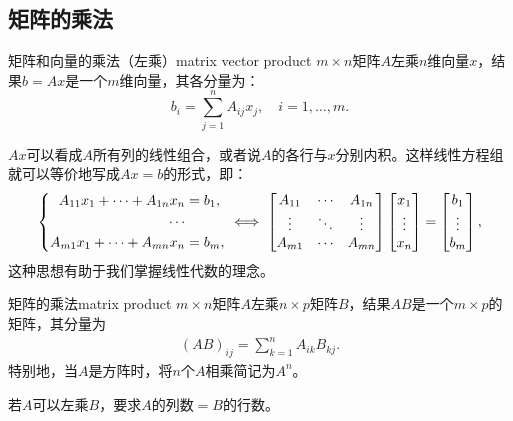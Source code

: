 \subsection{矩阵的乘法}

\begin{definition}
	{矩阵和向量的乘法（左乘）}{matrix vector product}
	$m\times n$矩阵$A$左乘$n$维向量$x$，结果$b=Ax$是一个$m$维向量，其各分量为：
	\begin{equation}
		b_i=\sum_{j=1}^nA_{ij}x_j,\quad i=1,\ldots,m.
	\end{equation}
\end{definition}

\begin{remark}
	$Ax$可以看成$A$所有列的线性组合，或者说$A$的各行与$x$分别内积。这样线性方程组就可以等价地写成$Ax=b$的形式，即：
	\[
		\left\{\begin{aligned}
	        A_{11}x_1+\cdots+A_{1n}x_n&=b_1,\\
	        \cdots&\\
	        A_{m1}x_1+\cdots+A_{mn}x_n&=b_m,
	    \end{aligned}\right.\iff
	    \begin{bmatrix}
	        A_{11}&\cdots&A_{1n}\\
	        \vdots&\ddots&\vdots\\
	        A_{m1}&\cdots&A_{mn}
	    \end{bmatrix}
	    \begin{bmatrix}
	        x_1\\\vdots\\x_n
	    \end{bmatrix}=
	    \begin{bmatrix}
	        b_1\\\vdots\\b_m
	    \end{bmatrix},
	\]
	这种思想有助于我们掌握线性代数的理念。
\end{remark}

\begin{definition}{矩阵的乘法}{matrix product}
	$m\times n$矩阵$A$左乘$n\times p$矩阵$B$，结果$AB$是一个$m\times p$的矩阵，其分量为
	\begin{align}
		(AB)_{ij}=\sum_{k=1}^nA_{ik}B_{kj}.
	\end{align}
	特别地，当$A$是方阵时，将$n$个$A$相乘简记为$A^n$。
\end{definition}

\begin{remark}
	若$A$可以左乘$B$，要求$A$的列数$=B$的行数。
\end{remark}

